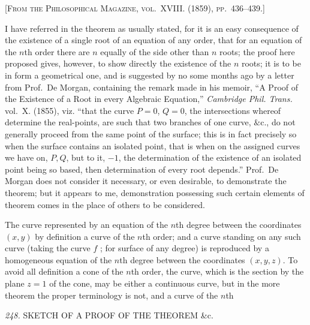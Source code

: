\documentclass[11pt,a4paper]{book}
\begin{document}
\textsc{[From the Philosophical Magazine, vol.~XVIII. (1859), pp.~436--439.]}

\medskip

I have referred in the theorem as usually stated, for it is an easy consequence of the existence of a single root of an equation of any order, that for an equation of the $n$th order there are $n$ equally of the side other than $n$ roots; the proof here proposed gives, however, to show directly the existence of the $n$ roots; it is to be in form a geometrical one, and is suggested by no some months ago by a letter from Prof.~De Morgan, containing the remark made in his memoir, ``A Proof of the Existence of a Root in every Algebraic Equation,'' \textit{Cambridge Phil. Trans.} vol.~X. (1855), viz. ``that the curve $P=0$, $Q=0$, the intersections whereof determine the real-points, are such that two branches of one curve, $\&$c., do not generally proceed from the same point of the surface; this is in fact precisely so when the surface contains an isolated point, that is when on the assigned curves we have on, $P, Q$, but to it, $-1$, the determination of the existence of an isolated point being so based, then determination of every root depends.'' Prof.~De Morgan does not consider it necessary, or even desirable, to demonstrate the theorem; but it appears to me, demonstration possessing such certain elements of theorem comes in the place of others to be considered.

The curve represented by an equation of the $n$th degree between the coordinates $(x, y)$ by definition a curve of the $n$th order; and a curve standing on any such curve (taking the curve $f$ ; for surface of any degree) is reproduced by a homogeneous equation of the $n$th degree between the coordinates $(x, y, z)$. To avoid all definition a cone of the $n$th order, the curve, which is the section by the plane $z = 1$ of the cone, may be either a continuous curve, but in the more theorem the proper terminology is not, and a curve of the $n$th

\setcounter{page}{117}

\noindent\textit{248.} \quad SKETCH OF A PROOF OF THE THEOREM \&c.
\end{document}
